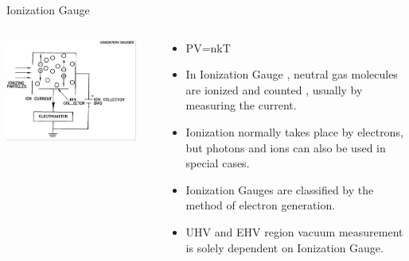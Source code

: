 \documentclass[11pt]{beamer}
\begin{document}
\begin{frame}{Ionization Gauge}

\begin{columns}[t]
    
      
       \begin{exampleblock}{}
          \begin{center}
			\includegraphics[width=0.9\textwidth]{IonizationGauge.png}
		\end{center}
       \end{exampleblock}
       
       \begin{exampleblock}{ }
          \begin{itemize}
            \item PV=nkT     
            \item In Ionization Gauge , neutral gas molecules are ionized and counted , usually by measuring the current.
            \item Ionization normally takes place by electrons, but photons and ions can also be used in special cases.
            \item Ionization Gauges are classified by the method of electron generation.
            \item UHV and EHV region vacuum measurement is solely dependent on Ionization Gauge.
          \end{itemize}
       
       \end{exampleblock}   
   
    \end{columns}   



\end{frame}
\end{document}
